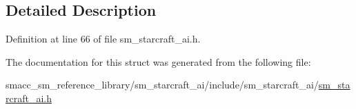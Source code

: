 \subsection{Detailed Description}


Definition at line 66 of file sm\+\_\+starcraft\+\_\+ai.\+h.



The documentation for this struct was generated from the following file\+:\begin{DoxyCompactItemize}
\item 
smacc\+\_\+sm\+\_\+reference\+\_\+library/sm\+\_\+starcraft\+\_\+ai/include/sm\+\_\+starcraft\+\_\+ai/\hyperlink{sm__starcraft__ai_8h}{sm\+\_\+starcraft\+\_\+ai.\+h}\end{DoxyCompactItemize}
